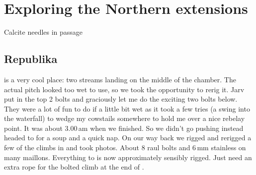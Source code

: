 \section{Exploring the Northern extensions}

\begin{marginfigure}
	\centering
         \caption{Calcite needles in \protect{} passage }
         \label{calcite needles}
 \end{marginfigure}

\subsection{Republika}  is a very cool place: two streams landing on the middle of the chamber. The actual pitch looked too wet to use, so we took the opportunity to rerig it. 
Jarv put in the top 2 bolts and graciously let me do the exciting two bolts below.  They were a lot of fun to do if a little bit wet as it took a few tries (a swing into the waterfall) to wedge my cowstails somewhere to hold me over a nice rebelay point. It was about 3.00\,am when we finished. So we didn't go pushing instead headed to  for a soup and a quick nap.  On our way back we rigged and rerigged a few of the climbs in  and took photos. About 8 raul bolts and 6\,mm stainless on many maillons.
Everything to  is now approximately sensibly rigged. Just need an extra rope for the bolted climb at the end of .




